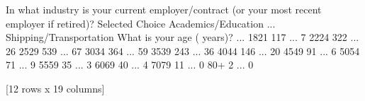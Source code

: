 \documentclass[letterpaper,10pt,english]{jupyterBook}
\begin{document}
\begin{sphinxVerbatim}[commandchars=\\\{\}]
In what industry is your current employer/contract (or your most recent employer if retired)? \PYGZhy{} Selected Choice  Academics/Education  ...  Shipping/Transportation
What is your age (\PYGZsh{} years)?                                                                                                           ...                         
18\PYGZhy{}21                                                                                                                            117  ...                        7
22\PYGZhy{}24                                                                                                                            322  ...                       26
25\PYGZhy{}29                                                                                                                            539  ...                       67
30\PYGZhy{}34                                                                                                                            364  ...                       59
35\PYGZhy{}39                                                                                                                            243  ...                       36
40\PYGZhy{}44                                                                                                                            146  ...                       20
45\PYGZhy{}49                                                                                                                             91  ...                        6
50\PYGZhy{}54                                                                                                                             71  ...                        9
55\PYGZhy{}59                                                                                                                             35  ...                        3
60\PYGZhy{}69                                                                                                                             40  ...                        4
70\PYGZhy{}79                                                                                                                             11  ...                        0
80+                                                                                                                                2  ...                        0

[12 rows x 19 columns]
\end{sphinxVerbatim}
\end{document}
